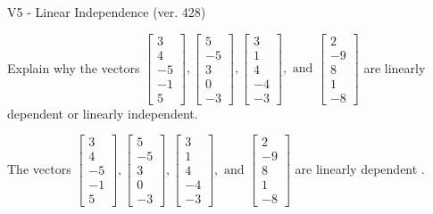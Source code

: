 \begin{exercise}
  \begin{exerciseTitle}V5 - Linear Independence (ver. 428)\end{exerciseTitle}
  \begin{exerciseStatement}
    Explain why the vectors \(\left[\begin{array}{r}
3 \\
4 \\
-5 \\
-1 \\
5
\end{array}\right] , \left[\begin{array}{r}
5 \\
-5 \\
3 \\
0 \\
-3
\end{array}\right] , \left[\begin{array}{r}
3 \\
1 \\
4 \\
-4 \\
-3
\end{array}\right] , \text{ and } \left[\begin{array}{r}
2 \\
-9 \\
8 \\
1 \\
-8
\end{array}\right]\) are linearly dependent or linearly independent.	


  \end{exerciseStatement}
  \begin{exerciseAnswer}
   The vectors \(\left[\begin{array}{r}
3 \\
4 \\
-5 \\
-1 \\
5
\end{array}\right] , \left[\begin{array}{r}
5 \\
-5 \\
3 \\
0 \\
-3
\end{array}\right] , \left[\begin{array}{r}
3 \\
1 \\
4 \\
-4 \\
-3
\end{array}\right] , \text{ and } \left[\begin{array}{r}
2 \\
-9 \\
8 \\
1 \\
-8
\end{array}\right]\) are 
  	 linearly dependent  .
  


  \end{exerciseAnswer}
\end{exercise}